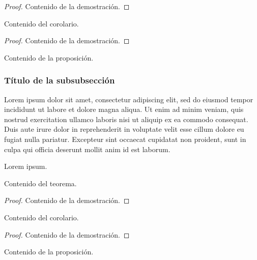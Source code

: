 \begin{proof}
    Contenido de la demostración.
\end{proof}

\begin{corolario}
    Contenido del corolario.
\end{corolario}

\begin{proof}
    Contenido de la demostración.
\end{proof}

\begin{proposicion}
    Contenido de la proposición.
\end{proposicion}

\subsubsection{Título de la subsubsección}

Lorem ipsum dolor sit amet, consectetur adipiscing elit, sed do eiusmod tempor incididunt ut labore et dolore magna aliqua. Ut enim ad minim veniam, quis nostrud exercitation ullamco laboris nisi ut aliquip ex ea commodo consequat. Duis aute irure dolor in reprehenderit in voluptate velit esse cillum dolore eu fugiat nulla pariatur. Excepteur sint occaecat cupidatat non proident, sunt in culpa qui officia deserunt mollit anim id est laborum.

Lorem ipsum.

\begin{teorema}
    Contenido del teorema.
\end{teorema}

\begin{proof}
    Contenido de la demostración.
\end{proof}

\begin{corolario}
    Contenido del corolario.
\end{corolario}

\begin{proof}
    Contenido de la demostración.
\end{proof}

\begin{proposicion}
    Contenido de la proposición.
\end{proposicion}
